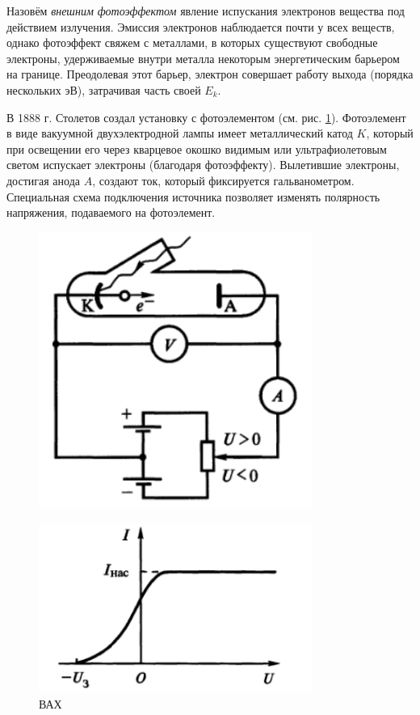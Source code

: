 Назовём \emph{внешним фотоэффектом} явление испускания электронов вещества под
действием излучения. Эмиссия электронов наблюдается почти у всех веществ, однако
фотоэффект свяжем с металлами, в которых существуют свободные электроны,
удерживаемые внутри металла некоторым энергетическим барьером на границе.
Преодолевая этот барьер, электрон совершает работу выхода (порядка нескольких
эВ), затрачивая часть своей $ E_k $.

В 1888 г. Столетов создал установку с фотоэлементом (см. рис.
\ref{fig:photoel}). Фотоэлемент в виде вакуумной двухэлектродной лампы имеет
металлический катод $ K $, который при освещении его через кварцевое окошко
видимым или ультрафиолетовым светом испускает электроны (благодаря фотоэффекту).
Вылетившие электроны, достигая анода $ A $, создают ток, который фиксируется
гальванометром. Специальная схема подключения источника позволяет изменять
полярность напряжения, подаваемого на фотоэлемент.

\begin{figure}[h]
  \centering
  \includegraphics[width=0.8\textwidth]{img/oral-05/photoel.png}
  \label{fig:photoel}
\end{figure}

\begin{figure}[h]
  \centering
  \includegraphics[width=0.8\textwidth]{img/oral-05/vah.png}
  \caption{ВАХ}
  \label{fig:vah}
\end{figure}

